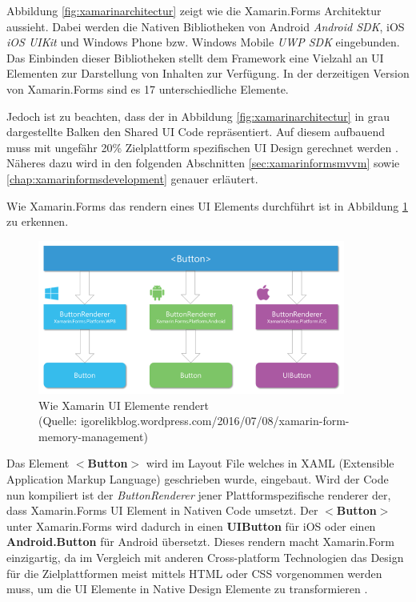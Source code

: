 	Abbildung \ref{fig:xamarinarchitectur} zeigt wie die Xamarin.Forms Architektur aussieht. Dabei werden die Nativen Bibliotheken von Android \textit{Android SDK}, iOS \textit{iOS UIKit} und Windows Phone bzw. Windows Mobile \textit{UWP SDK} eingebunden. Das Einbinden dieser Bibliotheken stellt dem Framework eine Vielzahl an UI Elementen zur Darstellung von Inhalten zur Verfügung. In der derzeitigen Version von Xamarin.Forms sind es 17 unterschiedliche Elemente.

	Jedoch ist zu beachten, dass der in Abbildung \ref{fig:xamarinarchitectur} in grau dargestellte Balken den Shared UI Code repräsentiert. Auf diesem aufbauend muss mit ungefähr 20\% Zielplattform spezifischen UI Design gerechnet werden \cite{book:Xamarin-Mobile-Application-Development}. Näheres dazu wird in den folgenden Abschnitten \ref{sec:xamarinformsmvvm} sowie \ref{chap:xamarinformsdevelopment} genauer erläutert.

	Wie Xamarin.Forms das rendern eines UI Elements durchführt ist in Abbildung \ref{fig:xamarinaformsrender} zu erkennen.

	\begin{figure}[h!]
		\centering
		\includegraphics[width=0.9\textwidth]{images/xamarinforms-button-rendering.png}
		\caption[Wie Xamarin UI Elemente rendert]{Wie Xamarin UI Elemente rendert\\\hspace{\textwidth}(Quelle: igorelikblog.wordpress.com/2016/07/08/xamarin-form-memory-management)}
		\label{fig:xamarinaformsrender}
	\end{figure}

	Das Element \textbf{$<$Button$>$} wird im Layout File welches in XAML (Extensible Application Markup Language) geschrieben wurde, eingebaut. Wird der Code nun kompiliert ist der \textit{ButtonRenderer} jener Plattformspezifische renderer der, dass Xamarin.Forms UI Element in Nativen Code umsetzt. Der \textbf{$<$Button$>$} unter Xamarin.Forms wird dadurch in einen \textbf{UIButton} für iOS oder einen \textbf{Android.Button} für Android übersetzt. Dieses rendern macht Xamarin.Form einzigartig, da im Vergleich mit anderen Cross-platform Technologien das Design für die Zielplattformen meist mittels HTML oder CSS vorgenommen werden muss, um die UI Elemente in Native Design Elemente zu transformieren \cite{book:Xamarin-Mobile-Application-Development}.


